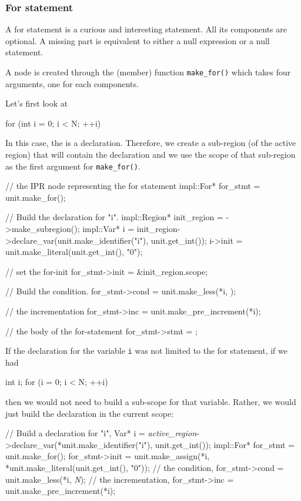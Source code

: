 \documentclass[11pt]{article}
\begin{document}
\subsubsection{For statement}
A for statement is a curious and interesting statement.  All its
components are optional.  A missing part is equivalent to either a null
expression or a null statement.

A  node is created through the (member) function
\texttt{make\_for()} which takes four arguments, one for each components.

Let's first look at 
\begin{Program}
  for (int i = 0; i < N; ++i)
\end{Program}
In this case, the  is a declaration.  Therefore,
we create a sub-region (of the active region) that will contain the declaration
and we use the scope of that sub-region as the first argument for
\texttt{make\_for()}. 
\begin{Program}
  // the IPR node representing the for statement 
  impl::For* for_stmt = unit.make_for();

  // Build the declaration for "i".
  impl::Region* init_region = ->make_subregion();
  impl::Var* i = init_region->declare_var(unit.make_identifier("i"),
                                          unit.get_int());
  i->init = unit.make_literal(unit.get_int(), "0");

  // set the for-init
  for_stmt->init = &init_region.scope;

  // Build the condition.
  for_stmt->cond = unit.make_less(*i, );

  // the incrementation
  for_stmt->inc = unit.make_pre_increment(*i);
  
  // the body of the for-statement
  for_stmt->stmt = ;
\end{Program}

If the declaration for the variable \texttt{i} was not limited to the
for statement, \ie{} if we had
\begin{Program}
  int i;
  for (i = 0; i < N; ++i)
\end{Program}
then we would not need to build a sub-scope for that variable.  Rather, we
would just build the declaration in the current scope:
\begin{Program}
// Build a declaration for "i",
Var* i = \textit{active_region}->declare_var(*unit.make_identifier("i"), unit.get_int());
impl::For* for_stmt = unit.make_for();
for_stmt->init = unit.make_assign(*i, *unit.make_literal(unit.get_int(), "0"));
// the condition,
for_stmt->cond = unit.make_less(*i, \textit{N});
// the incrementation,
for_stmt->inc = unit.make_pre_increment(*i);
\end{Program}
\end{document}
